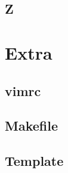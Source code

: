 \documentclass[12pt, a4paper, twoside]{article}
\begin{document}
\subsection{Z}




%
%

\section{Extra}

\subsection{vimrc}


\subsection{Makefile}


\subsection{Template}

\end{document}
